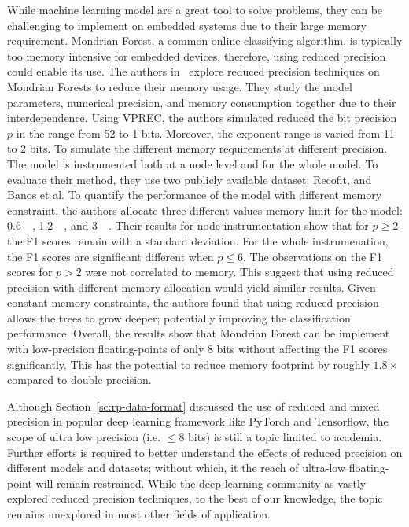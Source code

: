 While machine learning model are a great tool to solve problems, they can be challenging
to implement on embedded systems due to their large memory requirement.
Mondrian Forest, a common online classifying algorithm, is typically too memory intensive
for embedded devices, therefore, using reduced precision could enable its use.
The authors in~\cite{Vicuna2021-mw} explore reduced precision techniques on Mondrian Forests
to reduce their memory usage.
They study the model parameters, numerical precision, and memory consumption together
due to their interdependence.
Using VPREC, the authors simulated reduced the bit precision $p$ in the range from 52 to 1 bits.
Moreover, the exponent range is varied from 11 to 2 bits.
To simulate the different memory requirements at different precision.
The model is instrumented both at a node level and for the whole model.
To evaluate their method, they use two publicly available dataset: Recofit, and Banos et al.
To quantify the performance of the model with different memory constraint, the authors allocate three
different values memory limit for the model: \SI{0.6}{\mega\byte}, \SI{1.2}{\mega\byte}, and \SI{3}{\mega\byte}.
Their results for node instrumentation show that for $p \ge 2$ the F1 scores remain with a standard deviation.
For the whole instrumenation, the F1 scores are significant different when $p \le 6$.
The observations on the F1 scores for $p > 2$ were not correlated to memory.
This suggest that using reduced precision with different memory allocation would yield similar results.
Given constant memory constraints, the authors found that using reduced precision allows the 
trees to grow deeper; potentially improving the classification performance.
Overall, the results show that Mondrian Forest can be implement with low-precision floating-points
of only 8 bits without affecting the F1 scores significantly.
This has the potential to reduce memory footprint by roughly $1.8\times$ compared to double precision.

Although Section~\ref{sc:rp-data-format} discussed the use of reduced and mixed precision
in popular deep learning framework like PyTorch and Tensorflow, the scope of ultra low 
precision (i.e. $\le 8$ bits) is still a topic limited to academia.
Further efforts is required to better understand the effects of reduced precision
on different models and datasets; without which, it the reach of ultra-low floating-point
will remain restrained.
While the deep learning community as vastly explored reduced precision techniques,
to the best of our knowledge, the topic remains unexplored in most other fields of application.


